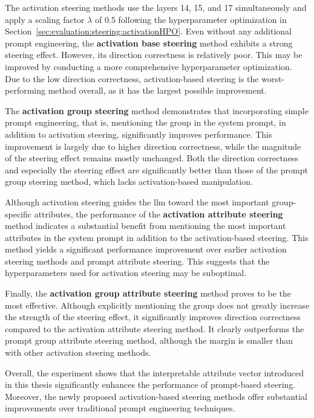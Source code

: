 The activation steering methods use the layers \num{14}, \num{15}, and \num{17} simultaneously and apply a scaling factor \(\lambda\) of \num{0.5} following the hyperparameter optimization in Section~\ref{sec:evaluation:steering:activationHPO}. Even without any additional prompt engineering, the \textbf{activation base steering} method exhibits a strong steering effect. However, its direction correctness is relatively poor. This may be improved by conducting a more comprehensive hyperparameter optimization. Due to the low direction correctness, activation-based steering is the worst-performing method overall, as it has the largest possible improvement.

The \textbf{activation group steering} method demonstrates that incorporating simple prompt engineering, that is, mentioning the group in the system prompt, in addition to activation steering, significantly improves performance. This improvement is largely due to higher direction correctness, while the magnitude of the steering effect remains mostly unchanged. Both the direction correctness and especially the steering effect are significantly better than those of the prompt group steering method, which lacks activation-based manipulation.

Although activation steering guides the \ac{llm} toward the most important group-specific attributes, the performance of the \textbf{activation attribute steering} method indicates a substantial benefit from mentioning the most important attributes in the system prompt in addition to the activation-based steering. This method yields a significant performance improvement over earlier activation steering methods and prompt attribute steering. This suggests that the hyperparameters used for activation steering may be suboptimal.

Finally, the \textbf{activation group attribute steering} method proves to be the most effective. Although explicitly mentioning the group does not greatly increase the strength of the steering effect, it significantly improves direction correctness compared to the activation attribute steering method. It clearly outperforms the prompt group attribute steering method, although the margin is smaller than with other activation steering methods.

Overall, the experiment shows  that the interpretable attribute vector introduced in this thesis significantly enhances the performance of prompt-based steering. Moreover, the newly proposed activation-based steering methods offer substantial improvements over traditional prompt engineering techniques.


